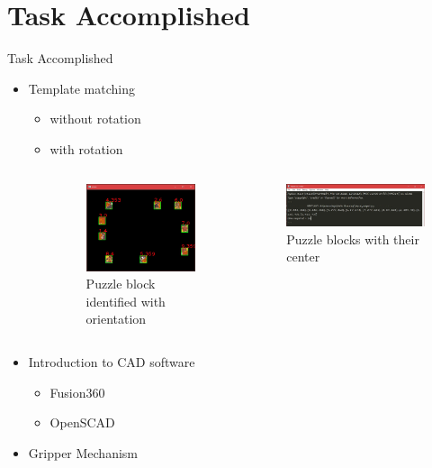 \documentclass[10pt,a4paper]{beamer}
\begin{document}
\section{Task Accomplished}
\begin{frame}{Task Accomplished}
\begin{itemize}
\item Template matching
\begin{itemize}
\item without rotation
\item with rotation
\begin{columns}
\column{0.5\framewidth}
\begin{figure}
\includegraphics[height=0.35\textheight]{template.jpg}\caption{Puzzle block identified with orientation}
\end{figure}
\column{0.5\framewidth}
\begin{figure}
\includegraphics[height=0.3\textheight, width=1\textwidth]{templatem.jpg}\caption{Puzzle blocks with their center}
\end{figure}
\end{columns}
\end{itemize}
\item Introduction to CAD software
\begin{itemize}
\item Fusion360
\item OpenSCAD
\end{itemize}
\item Gripper Mechanism
\end{itemize}
\end{frame}
\end{document}
